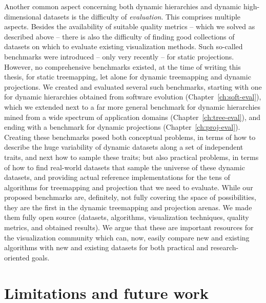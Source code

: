 Another common aspect concerning both dynamic hierarchies and dynamic high-dimensional datasets is the difficulty of \emph{evaluation}. This comprises multiple aspects. Besides the availability of suitable quality metrics -- which we solved as described above -- there is also the difficulty of finding good collections of datasets on which to evaluate existing visualization methods. Such so-called benchmarks were introduced -- only very recently -- for static projections. However, no comprehensive benchmarks existed, at the time of writing this thesis, for static treemapping, let alone for dynamic treemapping and dynamic projections. We created and evaluated several such benchmarks, starting with one for dynamic hierarchies obtained from software evolution (Chapter~\ref{ch:soft-eval}), which we extended next to a far more general benchmark for dynamic hierarchies mined from a wide spectrum of application domains (Chapter~\ref{ch:tree-eval}), and ending with a benchmark for dynamic projections (Chapter~\ref{ch:proj-eval}). 
Creating these benchmarks posed both conceptual problems, in terms of how to describe the huge variability of dynamic datasets along a set of independent traits, and next how to sample these traits; but also practical problems, in terms of how to find real-world datasets that sample the universe of these dynamic datasets, and providing actual reference implementations for the tens of algorithms for treemapping and projection that we need to evaluate. While our proposed benchmarks are, definitely, not fully covering the space of possibilities, they are the first in the dynamic treemapping and projection arenas. We made them fully open source (datasets, algorithms, visualization techniques, quality metrics, and obtained results). We argue that these are important resources for the visualization community which can, now, easily compare new and existing algorithms with new and existing datasets for both practical and research-oriented goals.



\section{Limitations and future work}

